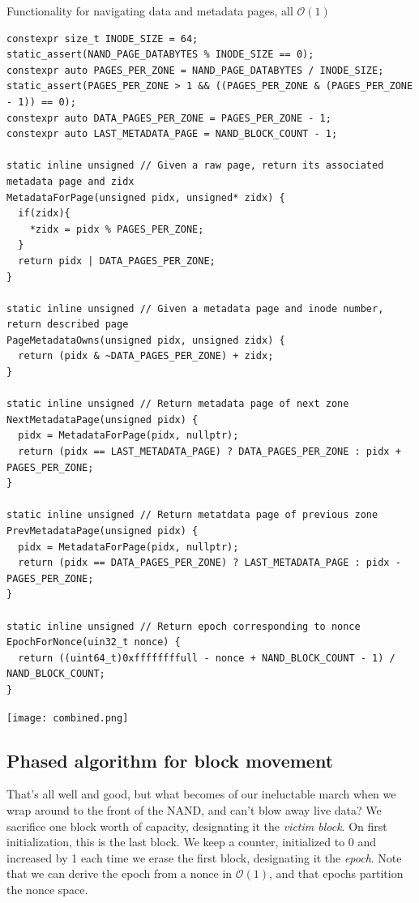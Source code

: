 \documentclass[letterpaper,10pt]{article}
\begin{document}
\begin{listing}[ht]
\caption{Functionality for navigating data and metadata pages, all $\mathcal{O}(1)$}
\begin{verbatim}
constexpr size_t INODE_SIZE = 64;
static_assert(NAND_PAGE_DATABYTES % INODE_SIZE == 0);
constexpr auto PAGES_PER_ZONE = NAND_PAGE_DATABYTES / INODE_SIZE;
static_assert(PAGES_PER_ZONE > 1 && ((PAGES_PER_ZONE & (PAGES_PER_ZONE - 1)) == 0);
constexpr auto DATA_PAGES_PER_ZONE = PAGES_PER_ZONE - 1;
constexpr auto LAST_METADATA_PAGE = NAND_BLOCK_COUNT - 1;

static inline unsigned // Given a raw page, return its associated metadata page and zidx
MetadataForPage(unsigned pidx, unsigned* zidx) {
  if(zidx){
    *zidx = pidx % PAGES_PER_ZONE;
  }
  return pidx | DATA_PAGES_PER_ZONE;
}

static inline unsigned // Given a metadata page and inode number, return described page
PageMetadataOwns(unsigned pidx, unsigned zidx) {
  return (pidx & ~DATA_PAGES_PER_ZONE) + zidx;
}

static inline unsigned // Return metadata page of next zone
NextMetadataPage(unsigned pidx) {
  pidx = MetadataForPage(pidx, nullptr);
  return (pidx == LAST_METADATA_PAGE) ? DATA_PAGES_PER_ZONE : pidx + PAGES_PER_ZONE;
}

static inline unsigned // Return metatdata page of previous zone
PrevMetadataPage(unsigned pidx) {
  pidx = MetadataForPage(pidx, nullptr);
  return (pidx == DATA_PAGES_PER_ZONE) ? LAST_METADATA_PAGE : pidx - PAGES_PER_ZONE;
}

static inline unsigned // Return epoch corresponding to nonce
EpochForNonce(uin32_t nonce) {
  return ((uint64_t)0xffffffffull - nonce + NAND_BLOCK_COUNT - 1) / NAND_BLOCK_COUNT;
}
\end{verbatim}
\end{listing}

\begin{minipage}{\textwidth}
\begin{center}
\texttt{[image: combined.png]}
\end{center}
\end{minipage}

\subsection{Phased algorithm for block movement} \label{shuffle}
That's all well and good, but what becomes of our ineluctable march when we
wrap around to the front of the NAND, and can't blow away live data? We
sacrifice one block worth of capacity, designating it the \textit{victim
  block}. On first initialization, this is the last block. We keep a counter,
initialized to 0 and increased by 1 each time we erase the first block,
designating it the \textit{epoch}. Note that we can derive the epoch from a
nonce in $\mathcal{O}(1)$, and that epochs partition the nonce space.
\end{document}

